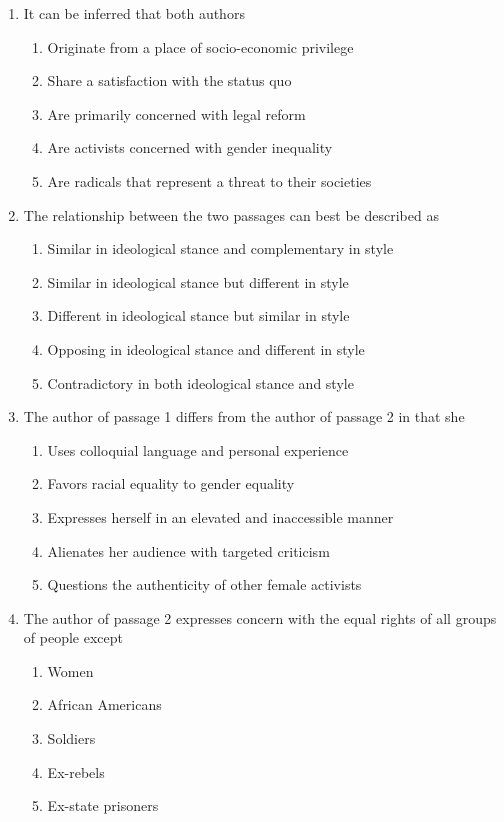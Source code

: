 \bigskip
\begin{enumerate}
\item It can be inferred that both authors
\begin{enumerate}[label=(\Alph*)]
\item Originate from a place of socio-economic privilege
\item Share a satisfaction with the status quo
\item Are primarily concerned with legal reform
\item Are activists concerned with gender inequality
\item Are radicals that represent a threat to their societies
\end{enumerate}

\newpage
\item The relationship between the two passages can best be described as
\begin{enumerate}[label=(\Alph*)]
\item Similar in ideological stance and complementary in style
\item Similar in ideological stance but different in style
\item Different in ideological stance but similar in style
\item Opposing in ideological stance and different in style
\item Contradictory in both ideological stance and style
\end{enumerate}

\bigskip
\item The author of passage 1 differs from the author of passage 2 in that she
\begin{enumerate}[label=(\Alph*)]
\item Uses colloquial language and personal experience
\item Favors racial equality to gender equality
\item Expresses herself in an elevated and inaccessible manner
\item Alienates her audience with targeted criticism
\item Questions the authenticity of other female activists
\end{enumerate}

\bigskip
\item The author of passage 2 expresses concern with the equal rights of all groups of people except
\begin{enumerate}[label=(\Alph*)]
\item Women
\item African Americans
\item Soldiers
\item Ex-rebels
\item Ex-state prisoners
\end{enumerate}


\end{enumerate}
